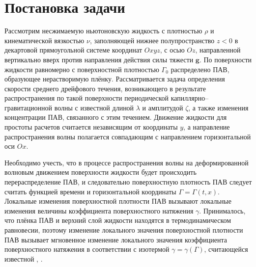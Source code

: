   \section{Постановка задачи}
  
  Рассмотрим несжимаемую ньютоновскую жидкость с плотностью $ \rho $ и кинематической вязкостью $ \nu $, заполняющей нижнее полупространство $ z<0 $ в декартовой прямоугольной системе координат $ Oxyz $, с осью $ Oz $, направленной вертикально вверх против направления действия силы тяжести $ \mathbf{g} $. По поверхности жидкости равномерно с поверхностной плотностью $ \Gamma_{0} $ распределено ПАВ, образующее нерастворимую плёнку. Рассматривается задача определения скорости среднего дрейфового течения, возникающего в результате распространения по такой поверхности периодической капиллярно--гравитационной волны с известной длиной  $ \lambda $ и амплитудой $ \zeta $, а также изменения концентрации ПАВ, связанного с этим течением. Движение жидкости для простоты расчетов считается независящим от координаты $ y $, а направление распространения волны полагается совпадающим с направлением горизонтальной оси $ Ox $.
  
Необходимо учесть, что в процессе распространения волны на деформированной волновым движением поверхности жидкости будет происходить перераспределение ПАВ, и следовательно поверхностную плотность ПАВ следует считать функцией времени и горизонтальной координаты $ \Gamma=\Gamma \left( t, x \right) $. Локальные изменения поверхностной плотности ПАВ вызывают локальные изменения величины коэффициента поверхностного натяжения $ \gamma $. Принималось, что плёнка ПАВ и верхний слой жидкости находятся в термодинамическом равновесии, поэтому изменение локального значения поверхностной плотности ПАВ вызывает мгновенное изменение локального значения коэффициента поверхностного натяжения в соответствии с изотермой $ \gamma = \gamma \left( \Gamma \right) $, считающейся известной \parencite{Levich}, \parencite{lucassen1969eh}. 

